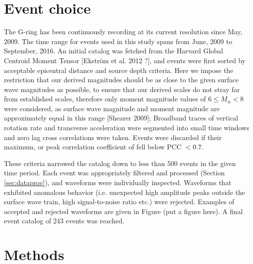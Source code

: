 \documentclass{gji}
\begin{document}
\section{Event choice}
The G-ring has been continuously recording at its current resolution since May, 2009. %
The time range for events used in this study spans from June, 2009 to September, 2016. An initial catalog was fetched from the Harvard Global Centroid Moment Tensor [Ekstr\"om et al. 2012 ?], %
and events were first sorted by acceptable epicentral distance and source depth criteria. Here we impose the restriction that our derived magnitudes should be as close to the given surface wave magnitudes as possible, to ensure that our derived scales do not stray far from established scales, therefore only moment magnitude values of $6 \le M_{w} < 8$ were considered, as surface wave magnitude and moment magnitude are approximately equal in this range [Shearer 2009]; %
Broadband traces of vertical rotation rate and transverse acceleration were segmented into small time windows and zero lag cross correlations were taken. Events were discarded if their maximum, or peak correlation coefficient of fell below PCC $< 0.7$. 

These criteria narrowed the catalog down to less than 500 events in the given time period. Each event was appropriately filtered and processed (Section \ref{sec:dataproc}), and waveforms were individually inspected. Waveforms that exhibited anomalous behavior (i.e. unexpected high amplitude peaks outside the surface wave train, high signal-to-noise ratio etc.) were rejected. Examples of accepted and rejected waveforms are given in Figure (put a figure here). A final event catalog of 243 events was reached.

\section{Methods}
\end{document}
